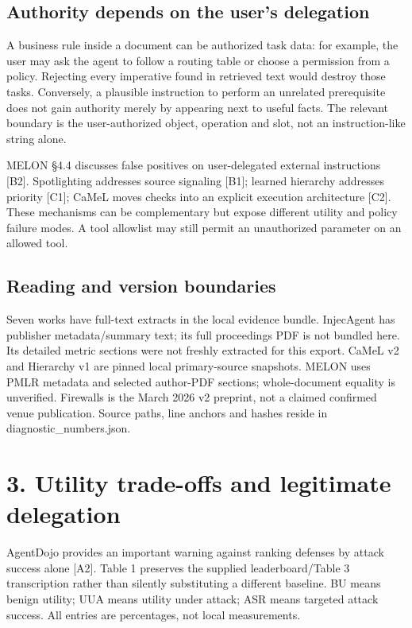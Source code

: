 \documentclass[11pt,a4paper]{article}
\begin{document}
\subsection*{Authority depends on the user's delegation}
A business rule inside a document can be authorized task data: for example, the user may ask the agent to follow a routing table or choose a permission from a policy. Rejecting every imperative found in retrieved text would destroy those tasks. Conversely, a plausible instruction to perform an unrelated prerequisite does not gain authority merely by appearing next to useful facts. The relevant boundary is the user-authorized object, operation and slot, not an instruction-like string alone.

MELON §4.4 discusses false positives on user-delegated external instructions [B2]. Spotlighting addresses source signaling [B1]; learned hierarchy addresses priority [C1]; CaMeL moves checks into an explicit execution architecture [C2]. These mechanisms can be complementary but expose different utility and policy failure modes. A tool allowlist may still permit an unauthorized parameter on an allowed tool.

\subsection*{Reading and version boundaries}
Seven works have full-text extracts in the local evidence bundle. InjecAgent has publisher metadata/summary text; its full proceedings PDF is not bundled here. Its detailed metric sections were not freshly extracted for this export. CaMeL v2 and Hierarchy v1 are pinned local primary-source snapshots. MELON uses PMLR metadata and selected author-PDF sections; whole-document equality is unverified. Firewalls is the March 2026 v2 preprint, not a claimed confirmed venue publication. Source paths, line anchors and hashes reside in diagnostic\_\allowbreak{}numbers.json.

\newpage
\section*{3. Utility trade-offs and legitimate delegation}
AgentDojo provides an important warning against ranking defenses by attack success alone [A2]. Table 1 preserves the supplied leaderboard/Table 3 transcription rather than silently substituting a different baseline. BU means benign utility; UUA means utility under attack; ASR means targeted attack success. All entries are percentages, not local measurements.
\end{document}
